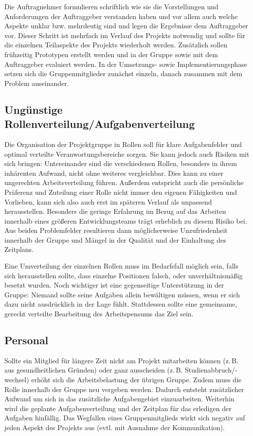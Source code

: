 \massnamen
  Die Auftragnehmer formulieren schriftlich wie sie die Vorstellungen und Anforderungen der Auftraggeber verstanden haben und vor allem auch welche Aspekte unklar bzw. mehrdeutig sind und legen die Ergebnisse dem Auftraggeber vor.
  Dieser Schritt ist mehrfach im Verlauf des Projekts notwendig und sollte für die einzelnen Teilaspekte des Projekts wiederholt werden.
  Zusätzlich sollen frühzeitig Prototypen erstellt werden und in der Gruppe sowie mit dem Auftraggeber evaluiert werden.
  In der Umsetzungs- sowie Implementierungsphase setzen sich die Gruppenmitglieder zunächst einzeln, danach zusammen mit dem Problem auseinander.

\subsection{Ungünstige Rollenverteilung/Aufgabenverteilung}\label{r5}
  Die Organisation der Projektgruppe in Rollen soll für klare Aufgabenfelder und optimal verteilte Veranwortungsbereiche sorgen. Sie kann jedoch auch Risiken mit sich bringen: Untereinander sind die verschiedenen Rollen, besonders in ihrem inhärenten Aufwand, nicht ohne weiteres vergleichbar. Dies kann zu einer ungerechten Arbeitsverteilung führen. Außerdem entspricht auch die persönliche Präferenz und Zuteilung einer Rolle nicht immer den eigenen Fähigkeiten und Vorlieben, kann sich also auch erst im späteren Verlauf als unpassend herausstellen. Besonders die geringe Erfahrung im Bezug auf das Arbeiten innerhalb eines größeren Entwicklungsteams trägt erheblich zu diesem Risiko bei. Aus beiden Problemfelder resultieren dann möglicherweise Unzufriedenheit innerhalb der Gruppe und Mängel in der Qualität und der Einhaltung des Zeitplans.

\massnamen
  Eine Umverteilung der einzelnen Rollen muss im Bedarfsfall möglich sein, falls sich herausstellen sollte, dass einzelne Positionen falsch, oder unverhältnismäßig besetzt wurden. Noch wichtiger ist eine gegenseitige Unterstützung in der Gruppe: Niemand sollte seine Aufgaben allein bewältigen müssen, wenn er sich dazu nicht ausdrücklich in der Lage fühlt. Stattdessen sollte eine gemeinsame, gerecht verteilte Bearbeitung des Arbeitspensums das Ziel sein.

\subsection{Personal}\label{r4}
  Sollte ein Mitglied für längere Zeit nicht am Projekt mitarbeiten können (z.\,B. aus gesundheitlichen Gründen) oder ganz ausscheiden (z.\,B. Studienabbruch/-wechsel) erhöht sich die Arbeitsbelastung der übrigen Gruppe.
  Zudem muss die Rolle innerhalb der Gruppe neu vergeben werden.
  Dadurch entsteht zusätzlicher Aufwand um sich in das zusätzliche Aufgabengebiet einzuarbeiten.
  Weiterhin wird die geplante Aufgabenverteilung und der Zeitplan für das erledigen der Aufgaben hinfällig.
  Das Wegfallen eines Gruppenmitglieds wirkt sich negativ auf jeden Aspekt des Projekts aus (evtl. mit Ausnahme der Kommunikation).
  
